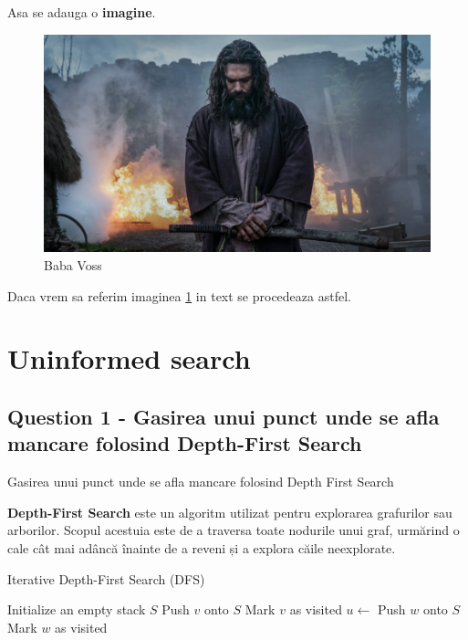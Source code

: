\par Asa se adauga o \textbf{imagine}.
\begin{figure}[H]
    \centering  %
    \includegraphics[scale=0.35]{resources/see_image.jpg}  %
    \caption{Baba Voss}  %
    \label{fig:figura1} %
\end{figure}
Daca vrem sa referim imaginea \ref{fig:figura1} in text se procedeaza astfel.


\section{Uninformed search}
\subsection{Question 1 - Gasirea unui punct unde se afla mancare folosind Depth-First Search}
\par Gasirea unui punct unde se afla mancare folosind Depth First Search
\par \textbf{Depth-First Search} este un algoritm utilizat pentru explorarea grafurilor sau arborilor. Scopul acestuia este de a traversa toate nodurile unui graf, urmărind o cale cât mai adâncă înainte de a reveni și a explora căile neexplorate.

\begin{algorithm}
\caption{Iterative Depth-First Search (DFS)}
\begin{algorithmic}[1]
    \State Initialize an empty stack $S$
    \State Push $v$ onto $S$
    \State Mark $v$ as visited
        \State $u \gets$ 
                \State Push $w$ onto $S$
                \State Mark $w$ as visited
            \EndIf
        \EndFor
    \EndWhile
\EndProcedure
\end{algorithmic}
\end{algorithm}

